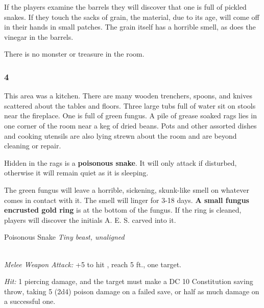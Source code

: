 \documentclass[palace_of_the_silver_princess]{subfiles}
\begin{document}
If the players examine the barrels they will discover that one is full
of pickled snakes. If they touch the sacks of grain, the material, due
to its age, will come off in their hands in small patches. The grain
itself has a horrible smell, as does the vinegar in the barrels.

There is no monster or treasure in the room.

\subsubsection{4}

\begin{quotebox}
    This area was a kitchen. There are many wooden trenchers, spoons,
    and knives scattered about the tables and floors. Three large tubs
    full of water sit on stools near the fireplace. One is full of green
    fungus. A pile of grease soaked rags lies in one corner of the room
    near a keg of dried beans. Pots and other assorted dishes and
    cooking utensils are also lying strewn about the room and are beyond
    cleaning or repair.
\end{quotebox}

Hidden in the rags is a \textbf{poisonous snake}.  It will only attack
if disturbed, otherwise it will remain quiet as it is sleeping.

The green fungus will leave a horrible, sickening, skunk-like smell on
whatever comes in contact with it. The smell will linger for 3-18 days.
\textbf{A small fungus encrusted gold ring} is at the bottom of the
fungus. If the ring is cleaned, players will discover the initials A. E.
S. carved into it.

\begin{monsterbox}{Poisonous Snake}
    \textit{Tiny beast, unaligned}\\
    \hline
    \basics[%
        armorclass = 13,
        hitpoints  = 2 (1d4),
        speed      = {30 ft., swim 30 ft.}
    ]
    \hline
    \stats[
        STR = \stat{2},
        DEX = \stat{16},
        CON = \stat{11},
        INT = \stat{1},
        WIS = \stat{10},
        CHA = \stat{3}
    ]
    \hline
    \details[
        senses = {blindsight 10 ft., passive Perception 10},
        languages = {---},
        challenge = {1/8 (25 XP)},
    ]
    \hline
    \\[1mm]
     \begin{monsteraction}[Bite]
         \textit{Melee Weapon Attack:} +5 to hit , reach 5 ft., one
         target.

         \textit{Hit:} 1 piercing damage, and the target must make a DC
         10 Constitution saving throw, taking 5 (2d4) poison damage on a
         failed save, or half as much damage on a successful one.
     \end{monsteraction}
\end{monsterbox}
\end{document}
